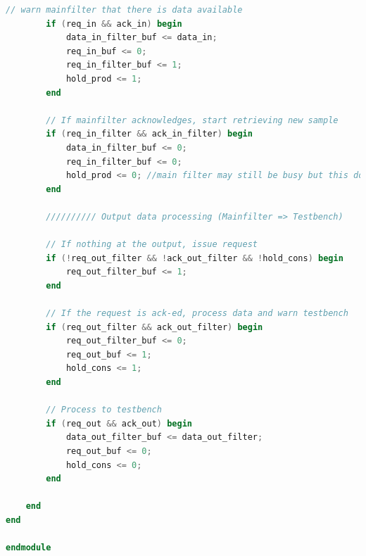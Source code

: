\documentclass[a4paper,twoside,11pt, fleqn]{article}
\begin{document}
\begin{lstlisting}[language=Verilog]
        // warn mainfilter that there is data available
        if (req_in && ack_in) begin
            data_in_filter_buf <= data_in;
            req_in_buf <= 0;
            req_in_filter_buf <= 1;
            hold_prod <= 1;
        end

        // If mainfilter acknowledges, start retrieving new sample
        if (req_in_filter && ack_in_filter) begin
            data_in_filter_buf <= 0;
            req_in_filter_buf <= 0;
            hold_prod <= 0; //main filter may still be busy but this does not matter, since it will just not acknowledge
        end

        ////////// Output data processing (Mainfilter => Testbench)

        // If nothing at the output, issue request
        if (!req_out_filter && !ack_out_filter && !hold_cons) begin
            req_out_filter_buf <= 1;
        end

        // If the request is ack-ed, process data and warn testbench
        if (req_out_filter && ack_out_filter) begin
            req_out_filter_buf <= 0;
            req_out_buf <= 1;
            hold_cons <= 1;
        end

        // Process to testbench
        if (req_out && ack_out) begin
            data_out_filter_buf <= data_out_filter;
            req_out_buf <= 0;
            hold_cons <= 0;
        end

    end
end

endmodule
\end{lstlisting}
\end{document}
